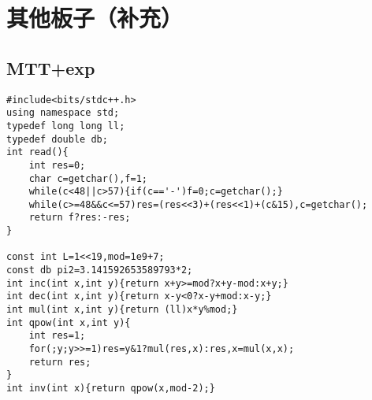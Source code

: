 \documentclass{ctexart}
\begin{document}
\newpage

\section{其他板子（补充）}

\subsection{MTT+exp}

\begin{lstlisting}
#include<bits/stdc++.h>
using namespace std;
typedef long long ll;
typedef double db;
int read(){
	int res=0;
	char c=getchar(),f=1;
	while(c<48||c>57){if(c=='-')f=0;c=getchar();}
	while(c>=48&&c<=57)res=(res<<3)+(res<<1)+(c&15),c=getchar();
	return f?res:-res;
}

const int L=1<<19,mod=1e9+7;
const db pi2=3.141592653589793*2;
int inc(int x,int y){return x+y>=mod?x+y-mod:x+y;}
int dec(int x,int y){return x-y<0?x-y+mod:x-y;}
int mul(int x,int y){return (ll)x*y%mod;}
int qpow(int x,int y){
	int res=1;
	for(;y;y>>=1)res=y&1?mul(res,x):res,x=mul(x,x);
	return res;
}
int inv(int x){return qpow(x,mod-2);}


\end{lstlisting}
\end{document}

